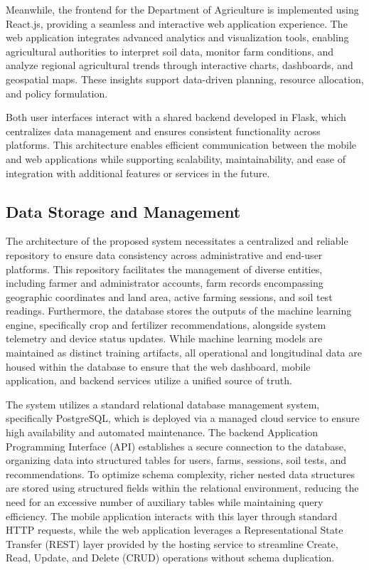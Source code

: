 {	Meanwhile, the frontend for the Department of Agriculture is implemented using React.js, providing a seamless and interactive web application experience. The web application integrates advanced analytics and visualization tools, enabling agricultural authorities to interpret soil data, monitor farm conditions, and analyze regional agricultural trends through interactive charts, dashboards, and geospatial maps. These insights support data-driven planning, resource allocation, and policy formulation.
	
	Both user interfaces interact with a shared backend developed in Flask, which centralizes data management and ensures consistent functionality across platforms. This architecture enables efficient communication between the mobile and web applications while supporting scalability, maintainability, and ease of integration with additional features or services in the future.
	
	\subsection{Data Storage and Management}
	The architecture of the proposed system necessitates a centralized and reliable repository to ensure data consistency across administrative and end-user platforms. This repository facilitates the management of diverse entities, including farmer and administrator accounts, farm records encompassing geographic coordinates and land area, active farming sessions, and soil test readings. Furthermore, the database stores the outputs of the machine learning engine, specifically crop and fertilizer recommendations, alongside system telemetry and device status updates. While machine learning models are maintained as distinct training artifacts, all operational and longitudinal data are housed within the database to ensure that the web dashboard, mobile application, and backend services utilize a unified source of truth.
	
	The system utilizes a standard relational database management system, specifically PostgreSQL, which is deployed via a managed cloud service to ensure high availability and automated maintenance. The backend Application Programming Interface (API) establishes a secure connection to the database, organizing data into structured tables for users, farms, sessions, soil tests, and recommendations. To optimize schema complexity, richer nested data structures are stored using structured fields within the relational environment, reducing the need for an excessive number of auxiliary tables while maintaining query efficiency. The mobile application interacts with this layer through standard HTTP requests, while the web application leverages a Representational State Transfer (REST) layer provided by the hosting service to streamline Create, Read, Update, and Delete (CRUD) operations without schema duplication.
	
}
